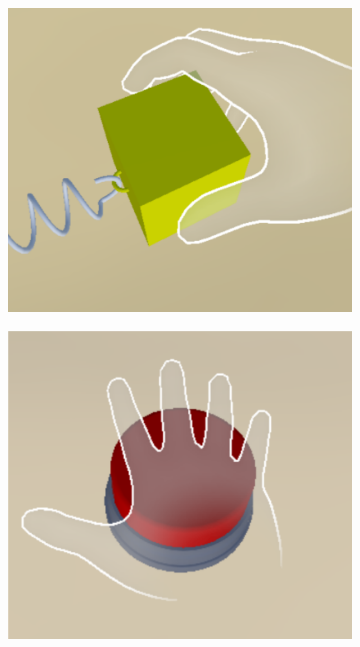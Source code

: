 \documentclass[runningheads]{llncs}
\begin{document}
\begin{figure}
  \begin{subfigure}{0.31\linewidth} %
    \centering
    \includegraphics[width=\linewidth]{image/predefined-gesture-puller.pdf}
    \caption{} %
    \label{fig:predefined-gestures-a}
  \end{subfigure}
  \hfill %
  \begin{subfigure}{0.31\linewidth} %
    \centering
    \includegraphics[width=\linewidth]{image/predefined-gesture-button.pdf}

\end{subfigure}
\end{figure}
\end{document}
